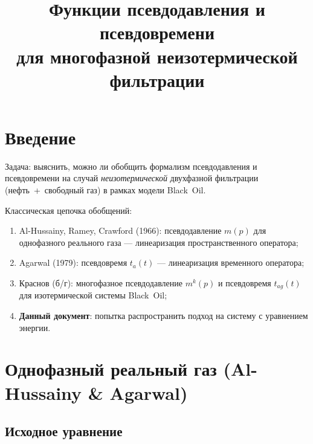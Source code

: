 ﻿\documentclass[12pt,a4paper]{article}
\title{Функции псевдодавления и псевдовремени\\
для многофазной неизотермической фильтрации}
\author{}
\date{}
\begin{document}
\maketitle
\tableofcontents
\newpage

\section{Введение}\label{sec:intro}

Задача: выяснить, можно ли обобщить формализм псевдодавления
и псевдовремени на случай \emph{неизотермической} двухфазной
фильтрации (нефть~+~свободный газ) в рамках модели Black~Oil.

Классическая цепочка обобщений:
\begin{enumerate}[nosep]
  \item Al-Hussainy, Ramey, Crawford (1966): псевдодавление $m(p)$
        для однофазного реального газа --- линеаризация
        пространственного оператора;
  \item Agarwal (1979): псевдовремя $t_a(t)$ --- линеаризация
        временного оператора;
  \item Краснов (б/г): многофазное псевдодавление $m^k(p)$ и
        псевдовремя $t_{ag}(t)$ для изотермической системы Black~Oil;
  \item \textbf{Данный документ}: попытка распространить подход на
        систему с уравнением энергии.
\end{enumerate}

\section{Однофазный реальный газ (Al-Hussainy \& Agarwal)}\label{sec:single}

\subsection{Исходное уравнение}\label{ssec:single_eq}
\end{document}
